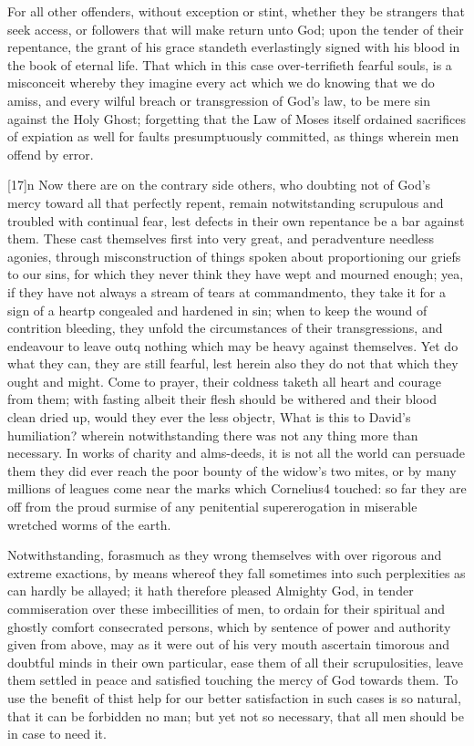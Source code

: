 For all other offenders, without exception or stint, whether they be strangers that seek access, or followers that will make return unto God; upon the tender of their repentance, the grant of his grace standeth everlastingly signed with his blood in the book of eternal life. That which in this case over-terrifieth fearful souls, is a misconceit whereby they imagine every act which we do knowing that we do amiss, and every wilful breach or transgression of God’s law, to be mere sin against the Holy Ghost; forgetting that the Law of Moses itself ordained sacrifices of expiation as well for faults presumptuously committed, as things wherein men offend by error.

[17]n Now there are on the contrary side others, who doubting not of God’s mercy toward all that perfectly repent, remain notwitstanding scrupulous and troubled with continual fear, lest defects in their own repentance be a bar  against them. These cast themselves first into very great, and peradventure needless agonies, through misconstruction of things spoken about proportioning our griefs to our sins, for which they never think they have wept and mourned enough; yea, if they have not always a stream of tears at commandmento, they take it for a sign of a heartp congealed and hardened in sin; when to keep the wound of contrition bleeding, they unfold the circumstances of their transgressions, and endeavour to leave outq nothing which may be heavy against themselves. Yet do what they can, they are still fearful, lest herein also they do not that which they ought and might. Come to prayer, their coldness taketh all heart and courage from them; with fasting albeit their flesh should be withered and their blood clean dried up, would they ever the less objectr, What is this to David’s humiliation? wherein notwithstanding there was not any thing more than necessary. In works of charity and alms-deeds, it is not all the world can persuade them they did ever reach the poor bounty of the widow’s two mites, or by many millions of leagues come near the marks which Cornelius4 touched: so far they are off from the proud surmise of any penitential supererogation in miserable wretched worms of the earth.

Notwithstanding, forasmuch as they wrong themselves with over rigorous and extreme exactions, by means whereof they fall sometimes into such perplexities as can hardly be allayed; it hath therefore pleased Almighty God, in tender commiseration over these imbecillities of men, to ordain for their spiritual and ghostly comfort consecrated persons, which by sentence of power and authority given from above, may as it were out of his very mouth ascertain timorous and doubtful  minds in their own particular, ease them of all their scrupulosities, leave them settled in peace and satisfied touching the mercy of God towards them. To use the benefit of thist help for our better satisfaction in such cases is so natural, that it can be forbidden no man; but yet not so necessary, that all men should be in case to need it.


